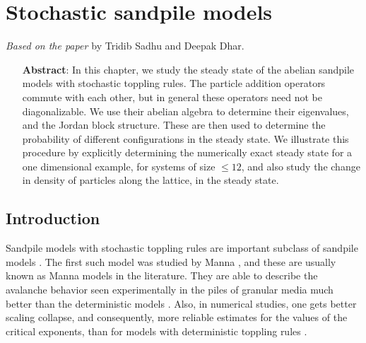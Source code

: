 \documentclass[11pt,a4paper]{book}
\begin{document}
\chapter{Stochastic sandpile models}\label{ch:manna}
\textit{Based on the paper \cite{myjsp1}} by Tridib Sadhu and Deepak Dhar.


\begin{itemize}
\item[\textbf{Abstract}:]
In this chapter, we study the steady state of the abelian sandpile models with stochastic 
toppling rules. The particle addition operators commute with each other, 
but in general these operators need not be diagonalizable. We 
use their abelian algebra to determine their eigenvalues, and the 
Jordan block structure. These are then used to determine the
probability of different configurations in the steady state. We
illustrate this procedure by explicitly determining the numerically
exact steady state for a one dimensional example, for systems of
size $\le12$, and also study the change in density of particles along
the lattice, in the steady state.
\end{itemize}


\section{Introduction}
Sandpile models with stochastic toppling rules are important subclass of 
sandpile models \cite{dharphysica06}.  The first such model was studied by 
Manna \cite{manna}, and  these are usually known as Manna models in
the literature. They are able to describe the avalanche 
behavior seen experimentally in the piles of granular media much better than 
the deterministic models \cite{osloexpt}. Also, in numerical studies, one 
gets better scaling collapse, and consequently, more reliable estimates 
for the values of the critical exponents, than for models with deterministic 
toppling rules \cite{stochnum}.
\end{document}
